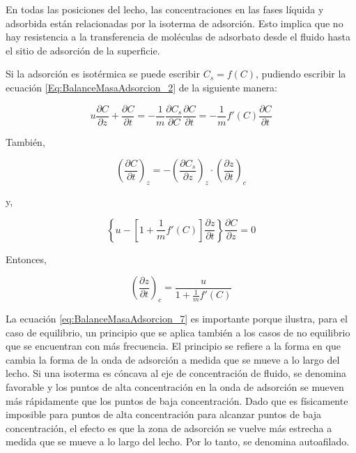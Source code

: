 \documentclass[11pt]{book}
\begin{document}
En todas las posiciones del lecho, las concentraciones en las fases líquida y adsorbida están relacionadas por la isoterma de adsorción. Esto implica que no hay resistencia a la transferencia de moléculas de adsorbato desde el fluido hasta el sitio de adsorción de la superficie.

Si la adsorción es isotérmica se puede escribir $C_s = f(C)$, pudiendo escribir la ecuación \ref{Eq:BalanceMasaAdsorcion_2} de la siguiente manera:

\begin{equation}
    \label{eq:BalanceMasaAdsorcion_6}
    u \frac{\partial C}{\partial z} + \frac{\partial C}{\partial t} = - \frac{1}{m} \frac{\partial C_s}{\partial C} \frac{\partial C}{\partial t} = - \frac{1}{m} f'(C) \frac{\partial C}{\partial t}
\end{equation}

También,

\begin{equation*}
    \left( \frac{\partial C}{\partial t} \right)_z = - \left( \frac{\partial C_s}{\partial z} \right)_z \cdot \left( \frac{\partial z}{\partial t} \right)_c
\end{equation*}

y,

\begin{equation*}
    \left\{ u - \left[ 1 + \frac{1}{m} f'(C) \right] \frac{\partial z}{\partial t} \right\} \frac{\partial C}{\partial z} = 0
\end{equation*}

Entonces,

\begin{equation}
    \label{eq:BalanceMasaAdsorcion_7}
    \left( \frac{\partial z}{\partial t} \right)_c = \frac{u}{1 + \frac{1}{m} f'(C)}
\end{equation}

La ecuación \ref{eq:BalanceMasaAdsorcion_7} es importante porque ilustra, para el caso de equilibrio, un principio que se aplica también a los casos de no equilibrio que se encuentran con más frecuencia. El principio se refiere a la forma en que cambia la forma de la onda de adsorción a medida que se mueve a lo largo del lecho. Si una isoterma es cóncava al eje de concentración de fluido, se denomina favorable y los puntos de alta concentración en la onda de adsorción se mueven más rápidamente que los puntos de baja concentración. Dado que es físicamente imposible para puntos de alta concentración
para alcanzar puntos de baja concentración, el efecto es que la zona de adsorción se vuelve más estrecha a medida que se mueve a lo largo del lecho. Por lo tanto, se denomina autoafilado.
\end{document}
